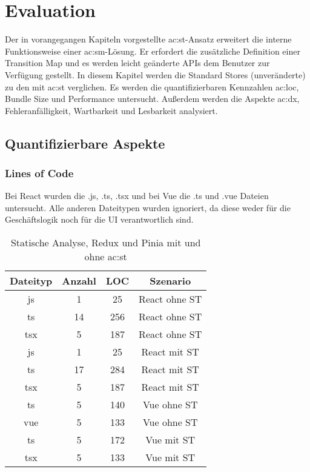 \chapter{Evaluation} \label{vergleich}

Der in vorangegangen Kapiteln vorgestellte \acrlong{ac:st}-Ansatz erweitert die interne Funktionsweise einer \acrlong{ac:sm}-Lösung. Er erfordert die zusätzliche Definition einer Transition Map und es werden leicht geänderte APIs dem Benutzer zur Verfügung gestellt. In diesem Kapitel werden die Standard Stores (unveränderte) zu den mit \acrlong{ac:st} verglichen. Es werden die quantifizierbaren Kennzahlen \acrlong{ac:loc}, Bundle Size und Performance untersucht. Außerdem werden die Aspekte \acrlong{ac:dx}, Fehleranfälligkeit, Wartbarkeit und Lesbarkeit analysiert.

\section{Quantifizierbare Aspekte}
\subsection{Lines of Code}

Bei React wurden die .js, .ts, .tsx und bei Vue die .ts und .vue Dateien untersucht. Alle anderen Dateitypen wurden ignoriert, da diese weder für die Geschäftslogik noch für die UI verantwortlich sind.

\begin{table}[!ht]
  \caption{Statische Analyse, Redux und Pinia mit und ohne \acrshort{ac:st}}
  \label{tab:staticAnalysisSTvsNoST}

  \begin{center}
    \begin{tabular}{|c|c|c|c|} 
    \hline
    Dateityp & Anzahl & LOC & Szenario \\ [0.5ex] 
    \hline\hline
    js & 1 & 25 & React ohne ST \\ 
    \hline
    ts & 14 & 256 & React ohne ST \\
    \hline
    tsx & 5 & 187 & React ohne ST \\
    \hline\hline
    js & 1 & 25 & React mit ST \\ 
    \hline
    ts & 17 & 284 & React mit ST \\
    \hline
    tsx & 5 & 187 & React mit ST \\
    \hline\hline
    ts & 5 & 140 & Vue ohne ST \\
    \hline
    vue & 5 & 133 & Vue ohne ST \\
    \hline\hline
    ts & 5 & 172 & Vue mit ST \\
    \hline
    tsx & 5 & 133 & Vue mit ST \\
    \hline
    \end{tabular}
  \end{center}
\end{table}

